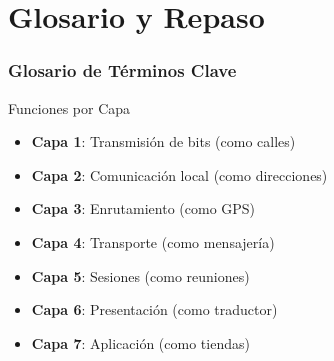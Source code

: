 \documentclass[aspectratio=169]{beamer}
\begin{document}
            
            
            \section{Glosario y Repaso}
            
            \begin{frame}
            \frametitle{Glosario de Términos Clave}
            
            \begin{block}{Funciones por Capa}
            \begin{itemize}
            \item \textbf{Capa 1}: Transmisión de bits (como calles)
            \item \textbf{Capa 2}: Comunicación local (como direcciones)
            \item \textbf{Capa 3}: Enrutamiento (como GPS)
            \item \textbf{Capa 4}: Transporte (como mensajería)
            \item \textbf{Capa 5}: Sesiones (como reuniones)
            \item \textbf{Capa 6}: Presentación (como traductor)
            \item \textbf{Capa 7}: Aplicación (como tiendas)
            \end{itemize}
            \end{block}
   
            \end{frame}
            
           
            
\end{document}
